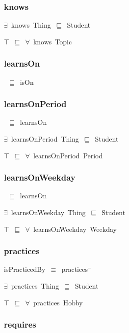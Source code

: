 \documentclass{article}
\begin{document}
\subsubsection*{knows}

\ensuremath{\exists}~knows~Thing~\ensuremath{\sqsubseteq}~Student

\ensuremath{\top}~\ensuremath{\sqsubseteq}~\ensuremath{\forall}~knows~Topic

\subsubsection*{learnsOn}

~\ensuremath{\sqsubseteq}~isOn

\subsubsection*{learnsOnPeriod}

~\ensuremath{\sqsubseteq}~learnsOn

\ensuremath{\exists}~learnsOnPeriod~Thing~\ensuremath{\sqsubseteq}~Student

\ensuremath{\top}~\ensuremath{\sqsubseteq}~\ensuremath{\forall}~learnsOnPeriod~Period

\subsubsection*{learnsOnWeekday}

~\ensuremath{\sqsubseteq}~learnsOn

\ensuremath{\exists}~learnsOnWeekday~Thing~\ensuremath{\sqsubseteq}~Student

\ensuremath{\top}~\ensuremath{\sqsubseteq}~\ensuremath{\forall}~learnsOnWeekday~Weekday

\subsubsection*{practices}

isPracticedBy~\ensuremath{\equiv}~practices\ensuremath{^-}

\ensuremath{\exists}~practices~Thing~\ensuremath{\sqsubseteq}~Student

\ensuremath{\top}~\ensuremath{\sqsubseteq}~\ensuremath{\forall}~practices~Hobby

\subsubsection*{requires}
\end{document}
